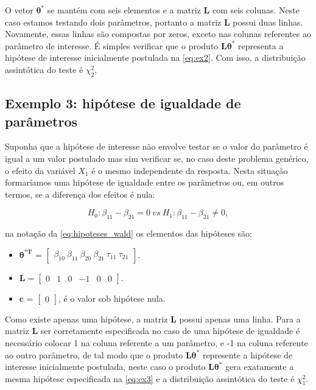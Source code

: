 \documentclass[AMA,STIX1COL]{WileyNJD-v2}
\begin{document}
O vetor $\boldsymbol{\theta^{*}}$ se mantém com seis elementos e a matriz $\boldsymbol{L}$ com seis colunas. Neste caso estamos testando dois parâmetros, portanto a matriz $\boldsymbol{L}$ possui duas linhas. Novamente, essas linhas são compostas por zeros, exceto nas colunas referentes ao parâmetro de interesse. É simples verificar que o produto $\boldsymbol{L}\boldsymbol{\theta^{*}}$ representa a hipótese de interesse inicialmente postulada na \autoref{eq:ex2}. Com isso, a distribuição assintótica do teste é $\chi^2_2$.

\subsection{Exemplo 3: hipótese de igualdade de parâmetros}

Suponha que a hipótese de interesse não envolve testar se o valor do parâmetro é igual a um valor postulado mas sim verificar se, no caso deste problema genérico, o efeito da variável $X_1$ é o mesmo independente da resposta. Nesta situação formaríamos uma hipótese de igualdade entre os parâmetros ou, em outros termos, se a diferença dos efeitos é nula:

\begin{equation}
\label{eq:ex3}
H_0: \beta_{11} - \beta_{21} = 0 \ vs \ H_1: \beta_{11} - \beta_{21} \neq 0,
\end{equation}

\noindent na notação da \autoref{eq:hipoteses_wald} os elementos das hipóteses são:

\begin{itemize}
  
  \item $\boldsymbol{\theta^{*T}}$ = $\begin{bmatrix} \beta_{10} \  \beta_{11} \ \beta_{20} \ \beta_{21} \ \tau_{11} \ \tau_{21} \end{bmatrix}$.


\item $\boldsymbol{L} = \begin{bmatrix} 0 & 1 & 0 & -1 & 0 & 0  \end{bmatrix}.$
 
\item $\boldsymbol{c}$ = $\begin{bmatrix} 0 \end{bmatrix}$, é o valor sob hipótese nula. 

\end{itemize}

Como existe apenas uma hipótese, a matriz $\boldsymbol{L}$ possui apenas uma linha. Para a matriz $\boldsymbol{L}$ ser corretamente especificada no caso de uma hipótese de igualdade é necessário colocar 1 na coluna referente a um parâmetro, e -1 na coluna referente ao outro parâmetro, de tal modo que o produto $\boldsymbol{L}\boldsymbol{\theta^{*}}$ represente a hipótese de interesse inicialmente postulada, neste caso o produto $\boldsymbol{L}\boldsymbol{\theta^{*}}$ gera exatamente a mesma hipótese especificada na \autoref{eq:ex3} e a distribuição assintótica do teste é $\chi^2_1$.
\end{document}
